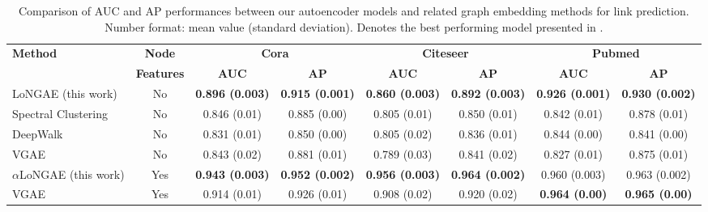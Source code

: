 \documentclass[letterpaper, conference]{IEEEtran}  %
\begin{document}
\begin{table}[ht]
\begin{center}
\caption[Caption of Table 4]{Comparison of AUC and AP performances between our autoencoder models and related graph embedding methods for link prediction. Number format: mean value (standard deviation). \footnotemark[4]Denotes the best performing model presented in \cite{VGAE:2016}.}
\begin{adjustbox}{width=0.9\textwidth}
	\begin{tabular} {l  c  c  c  c  c  c  c}
	\hline
	\multicolumn{1}{l}{\multirow{2}{*}{\textbf{Method}}} &
	\multicolumn{1}{c}{\multirow{1}{*}{\textbf{Node}}} & 
	\multicolumn{2}{c}{\multirow{1}{*}{\textbf{Cora}}} &
	\multicolumn{2}{c}{\multirow{1}{*}{\textbf{Citeseer}}} &
	\multicolumn{2}{c}{\multirow{1}{*}{\textbf{Pubmed}}} \\
	& \textbf{Features} & \textbf{AUC} & \textbf{AP} & \textbf{AUC} & \textbf{AP} & \textbf{AUC} & \textbf{AP} \\ \hline \hline
	LoNGAE (this work)
							& No
							& \textbf{0.896 (0.003)}
							& \textbf{0.915 (0.001)}
							& \textbf{0.860 (0.003)}
							& \textbf{0.892 (0.003)}
							& \textbf{0.926 (0.001)}
							& \textbf{0.930 (0.002)} \\
	Spectral Clustering \cite{Tang:2011}
					& No
					 & 0.846 (0.01)
					 & 0.885 (0.00)
					 & 0.805 (0.01)
					 & 0.850 (0.01)
					 & 0.842 (0.01)
					 & 0.878 (0.01) \\
	DeepWalk \cite{Perozzi:2014}
						& No
					        & 0.831 (0.01)
					        & 0.850 (0.00)
					        & 0.805 (0.02)
					        & 0.836 (0.01)
					        & 0.844 (0.00)
					        & 0.841 (0.00) \\
	VGAE\footnotemark[4] \cite{VGAE:2016}
					& No
				        & 0.843 (0.02)
				        & 0.881 (0.01)
				        & 0.789 (0.03)
				        & 0.841 (0.02)
				        & 0.827 (0.01)
				        & 0.875 (0.01) \\
	\hline
	$\alpha$LoNGAE (this work)
						& Yes
				 		& \textbf{0.943 (0.003)}
						& \textbf{0.952 (0.002)}
						& \textbf{0.956 (0.003)}
						& \textbf{0.964 (0.002)}
						& 0.960 (0.003)
						& 0.963 (0.002) \\
	VGAE\footnotemark[4] \cite{VGAE:2016}
				& Yes
				 & 0.914 (0.01)
				 & 0.926 (0.01)
				 & 0.908 (0.02)
				 & 0.920 (0.02)
				 & \textbf{0.964 (0.00)}
				 & \textbf{0.965 (0.00)} \\
	
	\hline
	\end{tabular}
	\label{tab4}
\end{adjustbox}
\end{center}
\end{table}
\end{document}

